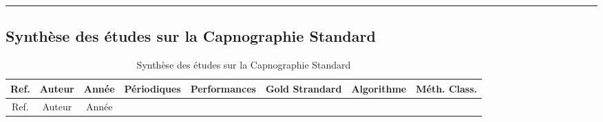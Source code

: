 \documentclass[12pt,]{article}
\begin{document}
\newpage
\begin{landscape}

\begin{center}\rule{0.5\linewidth}{\linethickness}\end{center}

\hypertarget{synthese-des-etudes-sur-la-capnographie-standard-1}{%
\subsection{Synthèse des études sur la Capnographie
Standard}\label{synthese-des-etudes-sur-la-capnographie-standard-1}}

\begin{longtable}[]{@{}ccccrrrr@{}}
\caption{Synthèse des études sur la Capnographie
Standard}\tabularnewline
\toprule
\begin{minipage}[b]{0.15\columnwidth}\centering
Ref.\strut
\end{minipage} & \begin{minipage}[b]{0.10\columnwidth}\centering
Auteur\strut
\end{minipage} & \begin{minipage}[b]{0.08\columnwidth}\centering
Année\strut
\end{minipage} & \begin{minipage}[b]{0.11\columnwidth}\centering
Périodiques\strut
\end{minipage} & \begin{minipage}[b]{0.10\columnwidth}\raggedleft
Performances\strut
\end{minipage} & \begin{minipage}[b]{0.10\columnwidth}\raggedleft
Gold Strandard\strut
\end{minipage} & \begin{minipage}[b]{0.07\columnwidth}\raggedleft
Algorithme\strut
\end{minipage} & \begin{minipage}[b]{0.08\columnwidth}\raggedleft
Méth. Class.\strut
\end{minipage}\tabularnewline
\midrule
\endfirsthead
\toprule
\begin{minipage}[b]{0.15\columnwidth}\centering
Ref.\strut
\end{minipage} & \begin{minipage}[b]{0.10\columnwidth}\centering
Auteur\strut
\end{minipage} & \begin{minipage}[b]{0.08\columnwidth}\centering
Année\strut
\end{minipage} & \begin{minipage}[b]{0.11\columnwidth}\centering

\end{minipage}
\end{longtable}
\end{landscape}
\end{document}
